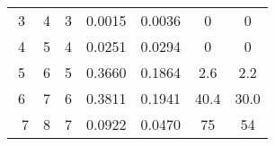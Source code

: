 \begin{table}
\begin{adjustbox}{width=0.95\textwidth,center=\textwidth}
\begin{tabular}{ccccccc}
3                                                         & 4                                                           & 3                                                   & 0.0015                                                                    & 0.0036                                                                    & 0                                                                           & 0                                                                                \\
4                                                         & 5                                                           & 4                                                   & 0.0251                                                                    & 0.0294                                                                    & 0                                                                           & 0                                                                                \\
5                                                         & 6                                                           & 5                                                   & 0.3660                                                                    & 0.1864                                                                    & 2.6                                                                         & 2.2                                                                              \\
6                                                         & 7                                                           & 6                                                   & 0.3811                                                                    & 0.1941                                                                    & 40.4                                                                        & 30.0                                                                             \\
~7                                                        & 8                                                           & 7                                                   & 0.0922                                                                    & 0.0470                                                                    & 75                                                                          & 54                                                                               \\

\end{tabular}
\end{adjustbox}
\end{table}
